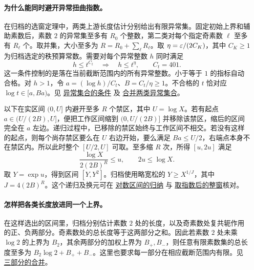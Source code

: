 \documentclass[UTF8,fontset=none,a4paper,11pt]{ctexart}
\theoremstyle{definition}
\newcommand{\src}[3]{\href{https://github.com/leanprover-community/riemann-hypothesis/blob/23aebbb302010b292314d406aa97f7901d698634/src/#1.lean\#L#2}{#3}}
\begin{document}
\paragraph{为什么能同时避开异常扭曲指数。}
在归档的选窗定理中，两类上游长度估计分别给出有限异常集。固定初始上界和辅助素数后，素数 $2$ 的异常集至多有 $R_0$ 个整数，第二类对每个指定奇素数 $\ell$ 至多有 $R_\ell$ 个。取并集，大小至多为 $R=R_0+\sum_\ell R_\ell$。取 $\eta=\varepsilon/(2C_K)$，其中 $C_K\ge1$ 为归档选定的秩预算常数。需要对每个异常整数 $h$ 同时满足
\[
                   h\le t^{C_t}\quad\Longrightarrow\quad h\le t^\eta,
                   \qquad C_t=401.
\]
这一条件控制的是落在当前截断范围内的所有异常整数。小于等于 $1$ 的指标自动合格。对 $h>1$，令 $a=(\log h)/C_t$、$B=C_t/\eta\ge1$。不合格的 $t$ 恰对应 $\log t\in[a,Ba)$。见
\src{Development/AutomorphicArithmetic/AutomorphicVarieties/LayeredIsomorphisms/SecondBound}{46}{异常集合的条件}
及 \src{Development/AutomorphicArithmetic/AutomorphicVarieties/LayeredIsomorphisms/ThmBabOf}{11}{合并两类异常集合}。

以下在实区间 $(0,U]$ 内避开至多 $R$ 个禁区，其中 $U=\log X$。若有起点 $a\in(U/(2B),U]$，便把工作区间缩到 $(0,U/(2B)]$ 并移除该禁区，缩后的区间完全在 $a$ 左边。递归过程中，已移除的禁区始终与工作区间不相交。若没有这样的起点，则每个尚存禁区要么在 $U$ 右边开始，要么满足 $Ba\le U/2$，右端点本身不在禁区内。所以此时整个 $[U/2,U]$ 可取。至多缩 $R$ 次，所得 $[u,2u]$ 满足
\[
                \frac{\log X}{2(2B)^R}\le u,\qquad 2u\le\log X .
\]
取 $Y=\exp u$，得到区间 $[Y,Y^2]$。归档使用略宽松的 $Y\ge X^{1/J}$，其中 $J=4(2B)^R$。这个递归及换元可在
\src{Development/AutomorphicArithmetic/AutomorphicVarieties/LayeredIsomorphisms/Window1}{7}{对数区间的归纳}
与 \src{Development/AutomorphicArithmetic/AutomorphicVarieties/LayeredIsomorphisms/Window}{7}{取指数后的整窗}核对。

\paragraph{怎样把各类长度放进同一个上界。}
在这样选出的区间里，归档分别估计素数 $2$ 处的长度，以及奇素数处复共轭作用的正、负两部分。奇素数处的总长度等于这两部分之和。因此若素数 $2$ 处未乘 $\log 2$ 的上界为 $B_2$，其余两部分的加权上界为 $B_+,B_-$，则任意有限素数集的总长度至多为 $B_2\log 2+B_++B_-$。这里也要求每一部分在相应截断范围内有限。见
\src{Development/AutomorphicArithmetic/AutomorphicVarieties/LengthEqAddEigen}{127}{三部分的合并}。
\end{document}
